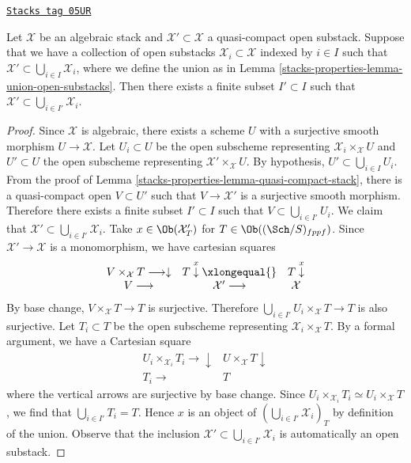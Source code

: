 \begin{lemma}
\label{stacks-properties-lemma-quasi-compact-finite-subcover}
\href{https://stacks.math.columbia.edu/tag/05UR}{\texttt{Stacks tag 05UR}}

Let $\mathcal X$ be an algebraic stack and $\mathcal X' \subset \mathcal X$
a quasi-compact open substack. Suppose that we have a collection of open
substacks $\mathcal{X}_i \subset \mathcal X$  indexed by $i \in I$ such
that $\mathcal{X}' \subset \bigcup_{i \in I} \mathcal{X}_i$,
where we define the union as in Lemma \ref{stacks-properties-lemma-union-open-substacks}.
Then there exists a finite subset $I' \subset I$ such that
$\mathcal{X}' \subset \bigcup_{i \in I'} \mathcal{X}_i$.
\end{lemma}

\begin{proof}
Since $\mathcal X$ is algebraic, there exists a scheme $U$ with a surjective
smooth morphism $U \to \mathcal X$. Let $U_i \subset U$ be the open subscheme
representing $\mathcal{X}_i \times_{\mathcal X} U$ and $U' \subset U$ the
open subscheme representing $\mathcal{X}' \times_{\mathcal X} U$. By
hypothesis, $U'\subset \bigcup_{i\in I} U_i$. From the proof of
Lemma \ref{stacks-properties-lemma-quasi-compact-stack},
there is a quasi-compact open $V \subset U'$ such that $V \to \mathcal{X}'$
is a surjective smooth morphism. Therefore there exists a finite subset
$I' \subset I$ such that $V \subset \bigcup_{i \in I'}
U_i$. We claim that $\mathcal{X}' \subset \bigcup_{i \in I'} \mathcal{X}_i$.
Take $x \in \Ob(\mathcal{X}'_T)$ for
$T \in \Ob((\Sch/S)_{fppf})$.
Since $\mathcal{X}' \to \mathcal{X}$ is a monomorphism, we have cartesian
squares
$$
\begin{array}{ccc}V \times_\mathcal{X} T \longrightarrow\downarrow & T \overset{x}{\downarrow}\xlongequal{} & T \overset{x}{\downarrow} \\ V \longrightarrow & \mathcal{X}' \longrightarrow & \mathcal X\end{array}
$$
By base change, $V \times_{\mathcal X} T \to T$ is surjective. Therefore
$\bigcup_{i \in I'} U_i \times_{\mathcal X} T \to T$ is also surjective.
Let $T_i \subset T$ be the open subscheme representing
$\mathcal{X}_i \times_{\mathcal X} T$.
By a formal argument, we have a Cartesian square
$$
\begin{array}{cc}U_i \times_{\mathcal{X}_i} T_i \longrightarrow\downarrow & U \times_{\mathcal X} T \downarrow \\ T_i \longrightarrow & T\end{array}
$$
where the vertical arrows are surjective by base change. Since
$U_i \times_{\mathcal{X}_i} T_i \simeq U_i \times_{\mathcal X} T$,
we find that $\bigcup_{i \in I'} T_i = T$. Hence
$x$ is an object of $(\bigcup_{i\in I'} \mathcal{X}_i)_T$ by
definition of the union. Observe that the inclusion
$\mathcal{X}' \subset \bigcup_{i \in I'} \mathcal{X}_i$
is automatically an open substack.
\end{proof}

